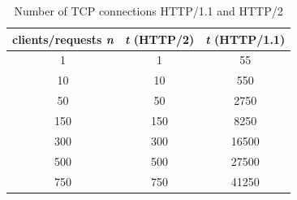 \begin{table}[h]
	\centering
\begin{tabular}{ | c | c | c | }

\hline
\textbf{clients/requests \textit{n}} &\textbf{\textit{t} (HTTP/2)} &\textbf{\textit{t} (HTTP/1.1)}\\ \hline \hline
1 & 1 & 55 \\ \hline
10 & 10 & 550\\ \hline
50 & 50 & 2750\\ \hline
150 & 150 & 8250\\ \hline
300 & 300 & 16500 \\ \hline
500 & 500 & 27500\\ \hline 
750 & 750 & 41250\\
\hline
\end{tabular}
\caption{Number of TCP connections HTTP/1.1 and HTTP/2}
\label{table:tcpconnects}
\end{table} 